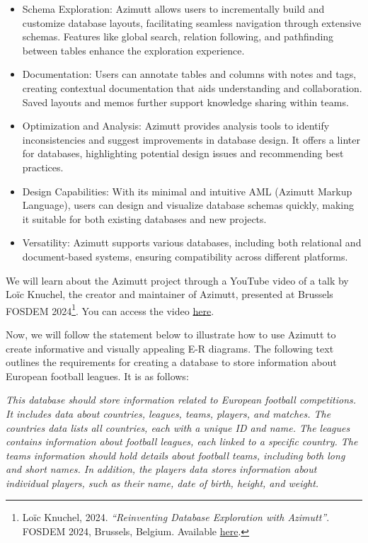 \documentclass{article}
\begin{document}
\begin{itemize}
    \item Schema Exploration: Azimutt allows users to incrementally build and customize database layouts, facilitating seamless navigation through extensive schemas. Features like global search, relation following, and pathfinding between tables enhance the exploration experience.
    \item Documentation: Users can annotate tables and columns with notes and tags, creating contextual documentation that aids understanding and collaboration. Saved layouts and memos further support knowledge sharing within teams.
    \item Optimization and Analysis: Azimutt provides analysis tools to identify inconsistencies and suggest improvements in database design. It offers a linter for databases, highlighting potential design issues and recommending best practices.
    \item Design Capabilities: With its minimal and intuitive AML (Azimutt Markup Language), users can design and visualize database schemas quickly, making it suitable for both existing databases and new projects.
    \item Versatility: Azimutt supports various databases, including both relational and document-based systems, ensuring compatibility across different platforms.
\end{itemize}

We will learn about the Azimutt project through a YouTube video of a talk by Loïc Knuchel, the creator and maintainer of Azimutt, presented at Brussels FOSDEM 2024\footnote{Loïc Knuchel, 2024. \textit{``Reinventing Database Exploration with Azimutt''}. FOSDEM 2024, Brussels, Belgium. Available \href{https://archive.fosdem.org/2024/schedule/event/fosdem-2024-3669-reinventing-database-exploration-with-azimutt/}{here}.}. You can access the video \href{https://youtu.be/6wYNlZKOtm0?si=HEfWTM7rY9YdATvC}{here}.

Now, we will follow the statement below to illustrate how to use Azimutt to create informative and visually appealing E-R diagrams. The following text outlines the requirements for creating a database to store information about European football leagues. It is as follows:

\textit{This database should store information related to European football competitions. It includes data about countries, leagues, teams, players, and matches. The countries data lists all countries, each with a unique ID and name. The leagues contains information about football leagues, each linked to a specific country. The teams information should hold details about football teams, including both long and short names. In addition, the players data stores information about individual players, such as their name, date of birth, height, and weight.}
\end{document}
